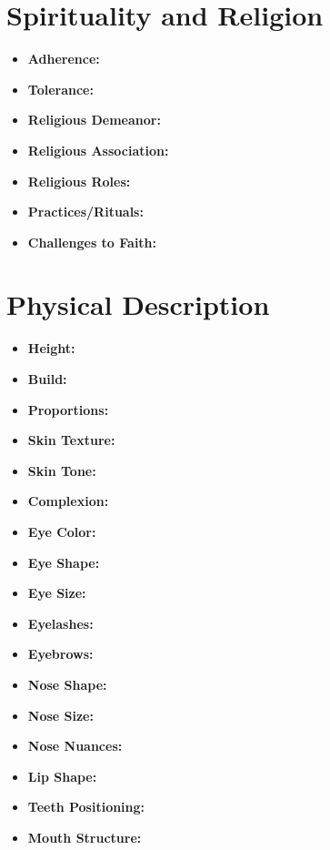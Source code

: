 \documentclass{article}
\begin{document}
\newpage

\section*{Spirituality and Religion}
\begin{itemize}
    \item \textbf{Adherence:} \hrulefill
    \item \textbf{Tolerance:} \hrulefill
    \item \textbf{Religious Demeanor:} \hrulefill
    \item \textbf{Religious Association:} \hrulefill
    \item \textbf{Religious Roles:} \hrulefill
    \item \textbf{Practices/Rituals:} \hrulefill
    \item \textbf{Challenges to Faith:} \hrulefill
\end{itemize}

\newpage

\section*{Physical Description}
\begin{itemize}
    \item \textbf{Height:} \hrulefill
    \item \textbf{Build:} \hrulefill
    \item \textbf{Proportions:} \hrulefill
    \item \textbf{Skin Texture:} \hrulefill
    \item \textbf{Skin Tone:} \hrulefill
    \item \textbf{Complexion:} \hrulefill
    \item \textbf{Eye Color:} \hrulefill
    \item \textbf{Eye Shape:} \hrulefill
    \item \textbf{Eye Size:} \hrulefill
    \item \textbf{Eyelashes:} \hrulefill
    \item \textbf{Eyebrows:} \hrulefill
    \item \textbf{Nose Shape:} \hrulefill
    \item \textbf{Nose Size:} \hrulefill
    \item \textbf{Nose Nuances:} \hrulefill
    \item \textbf{Lip Shape:} \hrulefill
    \item \textbf{Teeth Positioning:} \hrulefill
    \item \textbf{Mouth Structure:} \hrulefill
\end{itemize}
\end{document}
